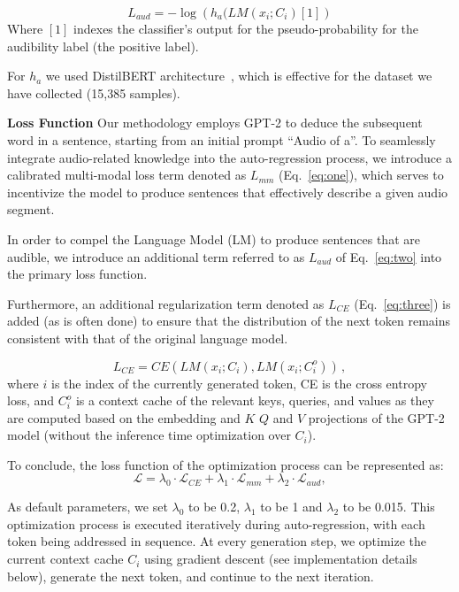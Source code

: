 \documentclass{article}
\begin{document}
\begin{equation}
\label{eq:two}
L_{aud} = -\log\left(h_a(LM(x_i;C_i)[1]\right)
\end{equation}
Where $[1]$ indexes the classifier's output for the pseudo-probability for the audibility label (the positive label).

For $h_a$ we used DistilBERT architecture~\cite{sanh2019distilbert}, which is effective for the dataset we have collected (15,385 samples).

\noindent\textbf{Loss Function\quad}
Our methodology employs GPT-2 to deduce the subsequent word in a sentence, starting from an initial prompt ``Audio of a''.
To seamlessly integrate audio-related knowledge into the auto-regression process, we introduce a calibrated multi-modal loss term denoted as $L_{mm}$ (Eq.~\ref{eq:one}), which serves to incentivize the model to produce sentences that effectively describe a given audio segment. 

In order to compel the Language Model (LM) to produce sentences that are audible, we introduce an additional term referred to as $L_{aud}$ of Eq.~\ref{eq:two} into the primary loss function.

Furthermore, an additional regularization term denoted as $L_{CE}$ (Eq.~\ref{eq:three}) is added (as is often done) to ensure that the distribution of the next token remains consistent with that of the original language model.

\begin{equation}
\label{eq:three}
L_{CE} = CE(LM(x_i;C_i),LM(x_i;C^o_i))\,,
\end{equation}
where $i$ is the index of the currently generated token, CE is the cross entropy loss, and $C^o_i$ is a context cache of the relevant keys, queries, and values as they are computed based on the embedding and $K$ $Q$ and $V$ projections of the GPT-2 model (without the inference time optimization over $C_i$).

To conclude, the loss function of the optimization process can be represented as:
\begin{equation}
\label{eq:four}
   \mathcal{L} = \lambda_0\cdot\mathcal{L}_{CE} + \lambda_1\cdot\mathcal{L}_{mm} + \lambda_2\cdot\mathcal{L}_{aud},
\end{equation}

As default parameters, we set $\lambda_0$ to be 0.2, $\lambda_1$ to be 1 and $\lambda_2$ to be 0.015.
This optimization process is executed iteratively during auto-regression, with each token being addressed in sequence. At every generation step, we optimize the current context cache $C_i$ using gradient descent (see implementation details below), generate the next token, and continue to the next iteration.
\end{document}
